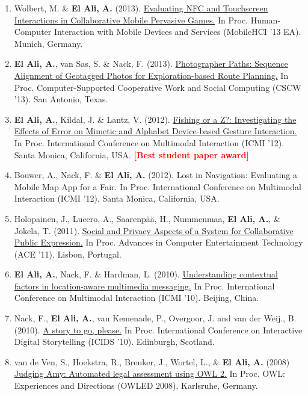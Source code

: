 \documentclass{article}
\begin{document}
\begin{enumerate}
\item Wolbert, M. \&  \textbf{El Ali, A.} (2013). \href{http://abdoelali.com/pdfs/p522-wolbert.pdf}{Evaluating NFC and Touchscreen Interactions in Collaborative Mobile Pervasive Games.} In Proc. Human-Computer Interaction with Mobile Devices and Services (MobileHCI '13 EA). Munich, Germany.

\item \textbf{El Ali, A.}, van Sas, S. \& Nack, F. (2013). \href{http://abdoelali.com/pdfs/p985-el-ali.pdf}{Photographer Paths: Sequence Alignment of Geotagged Photos for Exploration-based Route Planning.} In Proc. Computer-Supported Cooperative Work and Social Computing (CSCW '13). San Antonio, Texas.

\item \textbf{El Ali, A.}, Kildal, J. \& Lantz, V. (2012). \href{http://abdoelali.com/pdfs/fp129-elali.pdf}{Fishing or a Z?: Investigating the Effects of Error on Mimetic and Alphabet Device-based Gesture Interaction.} In Proc. International Conference on Multimodal Interaction (ICMI '12). Santa Monica, California, USA. \textbf{\textcolor{red}{[Best student paper award]}}

\item Bouwer, A., Nack, F. \&  \textbf{El Ali, A.} (2012). Lost in Navigation: Evaluating a Mobile Map App for a Fair. In Proc. International Conference on Multimodal Interaction (ICMI '12). Santa Monica, California, USA.

\item Holopainen, J., Lucero, A., Saarenp\"{a}\"{a}, H., Nummenmaa,  \textbf{El Ali, A.}, \& Jokela, T. (2011). \href{http://abdoelali.com/pdfs/a23-holopainen.pdf}{Social and Privacy Aspects of a System for Collaborative Public Expression.} In Proc. Advances in Computer Entertainment Technology (ACE '11). Lisbon, Portugal.

\item  \textbf{El Ali, A.}, Nack, F. \& Hardman, L. (2010). \href{http://abdoelali.com/pdfs/ICMI2010_camready_final.pdf}{Understanding contextual factors in location-aware multimedia messaging.} In Proc. International Conference on Multimodal Interaction (ICMI '10). Beijing, China.

\item Nack, F.,  \textbf{El Ali, A.}, van Kemenade, P., Overgoor, J. and van der Weij., B. (2010). \href{http://abdoelali.com/pdfs/nack_storytogo-2010.pdf}{A story to go, please.} In Proc. International Conference on Interactive Digital Storytelling (ICIDS '10). Edinburgh, Scotland.

\item van de Ven, S., Hoekstra, R., Breuker, J., Wortel, L., \&  \textbf{El Ali, A.} (2008) \href{http://abdoelali.com/pdfs/owled2008dc_paper_6.pdf}{Judging Amy: Automated legal assessment using OWL 2.} In Proc. OWL: Experiences and Directions (OWLED 2008). Karlsruhe, Germany.

\end{enumerate}
\end{document}
